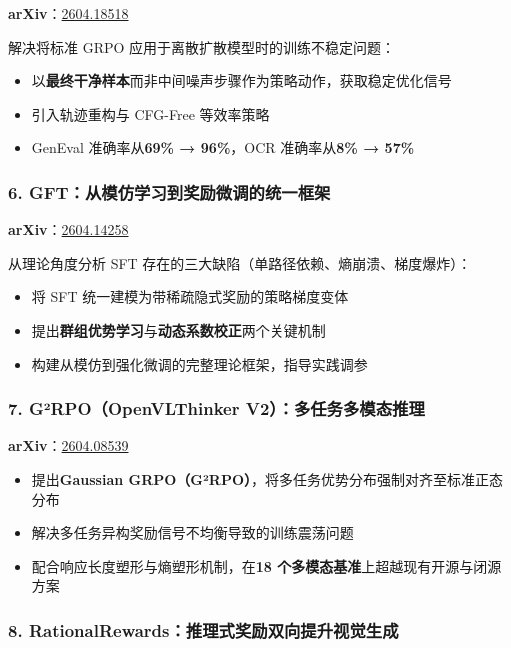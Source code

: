 \textbf{arXiv}：\href{https://arxiv.org/abs/2604.18518}{2604.18518}

解决将标准 GRPO 应用于离散扩散模型时的训练不稳定问题：

\begin{itemize}[leftmargin=1.5em]
  \item 以\textbf{最终干净样本}而非中间噪声步骤作为策略动作，获取稳定优化信号
  \item 引入轨迹重构与 CFG-Free 等效率策略
  \item GenEval 准确率从\textbf{69\% → 96\%}，OCR 准确率从\textbf{8\% → 57\%}
\end{itemize}

\subsubsection{6. GFT：从模仿学习到奖励微调的统一框架}

\textbf{arXiv}：\href{https://arxiv.org/abs/2604.14258}{2604.14258}

从理论角度分析 SFT 存在的三大缺陷（单路径依赖、熵崩溃、梯度爆炸）：

\begin{itemize}[leftmargin=1.5em]
  \item 将 SFT 统一建模为带稀疏隐式奖励的策略梯度变体
  \item 提出\textbf{群组优势学习}与\textbf{动态系数校正}两个关键机制
  \item 构建从模仿到强化微调的完整理论框架，指导实践调参
\end{itemize}

\subsubsection{7. G²RPO（OpenVLThinker V2）：多任务多模态推理}

\textbf{arXiv}：\href{https://arxiv.org/abs/2604.08539}{2604.08539}

\begin{itemize}[leftmargin=1.5em]
  \item 提出\textbf{Gaussian GRPO（G²RPO）}，将多任务优势分布强制对齐至标准正态分布
  \item 解决多任务异构奖励信号不均衡导致的训练震荡问题
  \item 配合响应长度塑形与熵塑形机制，在\textbf{18 个多模态基准}上超越现有开源与闭源方案
\end{itemize}

\subsubsection{8. RationalRewards：推理式奖励双向提升视觉生成}

